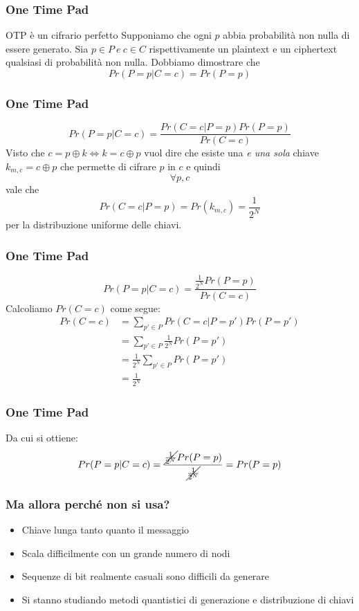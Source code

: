	\begin{frame}
		\frametitle{One Time Pad}
		\begin{block}{OTP è un cifrario perfetto}
			Supponiamo che ogni $p$ abbia probabilità non nulla di essere generato. Sia $p\in P \ e\ c \in C$ rispettivamente un plaintext e un ciphertext qualsiasi di probabilità non nulla. Dobbiamo dimostrare che $$Pr(P=p|C=c) = Pr(P=p)$$
		\end{block}
	\end{frame}
	\begin{frame}
		\frametitle{One Time Pad}
		$$Pr(P=p|C=c) = \frac{Pr(C=c|P=p)Pr(P=p)}{Pr(C=c)}$$
		Visto che $c = p \oplus k \Leftrightarrow k = c\oplus p$ vuol dire che esiste una \emph{e una sola} chiave $k_{m,c} = c \oplus p$ che permette di cifrare $p$ in $c$ e quindi $$\forall p,c$$ vale che $$Pr(C=c|P=p) = Pr(k_{m,c}) = \frac{1}{2^N}$$ per la distribuzione uniforme delle chiavi.
	\end{frame}
	\begin{frame}
		\frametitle{One Time Pad}
		$$Pr(P=p|C=c) = \frac{\frac{1}{2^N}Pr(P=p)}{Pr(C=c)}$$
		Calcoliamo $Pr(C=c)$ come segue:
		\begin{align*}
			Pr(C=c) &= \sum_{p'\in P}^{}Pr(C=c|P=p')Pr(P=p')\\
			&= \sum_{p'\in P} \frac{1}{2^N}Pr(P=p')\\
			&=\frac{1}{2^N}\sum_{p'\in P}Pr(P=p')\\
			&= \frac{1}{2^N}
		\end{align*}
	\end{frame}
	\begin{frame}
		\frametitle{One Time Pad}
		Da cui si ottiene:
		$$Pr(P=p|C=c) = \frac{\cancel{\frac{1}{2^N}}Pr(P=p)}{\cancel{\frac{1}{2^N}}} = Pr(P=p)$$
	\end{frame}
	\begin{frame}
		\frametitle{Ma allora perché non si usa?}
		\begin{itemize}
			\item Chiave lunga tanto quanto il messaggio
			\item Scala difficilmente con un grande numero di nodi
			\item Sequenze di bit realmente casuali sono difficili da generare
			\item Si stanno studiando metodi quantistici di generazione e distribuzione di chiavi
		\end{itemize}
	\end{frame}
